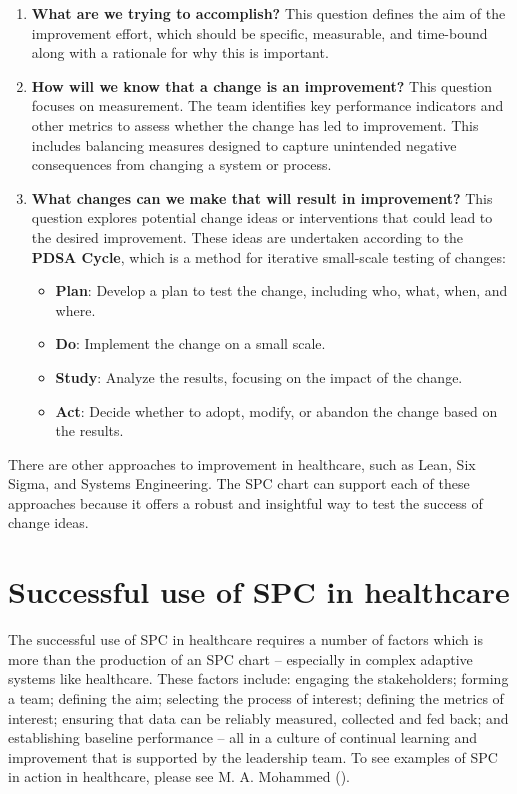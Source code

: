 \documentclass[
]{book}
\providecommand{\tightlist}{%
  \setlength{\itemsep}{0pt}\setlength{\parskip}{0pt}}
\begin{document}
\begin{enumerate}
\def\labelenumi{\arabic{enumi}.}
\item
  \textbf{What are we trying to accomplish?}
  This question defines the aim of the improvement effort, which should be specific, measurable, and time-bound along with a rationale for why this is important.
\item
  \textbf{How will we know that a change is an improvement?}
  This question focuses on measurement. The team identifies key performance indicators and other metrics to assess whether the change has led to improvement. This includes balancing measures designed to capture unintended negative consequences from changing a system or process.
\item
  \textbf{What changes can we make that will result in improvement?}
  This question explores potential change ideas or interventions that could lead to the desired improvement. These ideas are undertaken according to the \textbf{PDSA Cycle}, which is a method for iterative small-scale testing of changes:

  \begin{itemize}
  \tightlist
  \item
    \textbf{Plan}: Develop a plan to test the change, including who, what, when, and where.
  \item
    \textbf{Do}: Implement the change on a small scale.
  \item
    \textbf{Study}: Analyze the results, focusing on the impact of the change.
  \item
    \textbf{Act}: Decide whether to adopt, modify, or abandon the change based on the results.
  \end{itemize}
\end{enumerate}

There are other approaches to improvement in healthcare, such as Lean, Six Sigma, and Systems Engineering. The SPC chart can support each of these approaches because it offers a robust and insightful way to test the success of change ideas.

\section{Successful use of SPC in healthcare}\label{successful-use-of-spc-in-healthcare}

The successful use of SPC in healthcare requires a number of factors which is more than the production of an SPC chart -- especially in complex adaptive systems like healthcare. These factors include: engaging the stakeholders; forming a team; defining the aim; selecting the process of interest; defining the metrics of interest; ensuring that data can be reliably measured, collected and fed back; and establishing baseline performance -- all in a culture of continual learning and improvement that is supported by the leadership team. To see examples of SPC in action in healthcare, please see M. A. Mohammed ().
\end{document}
